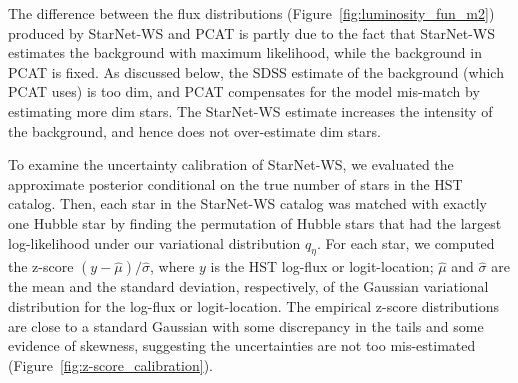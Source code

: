 The difference between the flux distributions  (Figure~\ref{fig:luminosity_fun_m2}) produced by StarNet-WS and PCAT
is partly due to the fact that StarNet-WS estimates the background with maximum likelihood, while the background in PCAT is fixed.
As discussed below, the SDSS estimate of the background (which PCAT uses) is too dim, and PCAT compensates for the model mis-match by estimating more dim stars. 
The StarNet-WS estimate increases the intensity of the background, and hence does not over-estimate dim stars. 



To examine the uncertainty calibration of StarNet-WS, we evaluated the approximate posterior 
conditional on the true number of stars in the HST catalog. 
Then, each star in the StarNet-WS catalog was matched with exactly one Hubble star by finding the permutation of Hubble stars that had the largest log-likelihood under our variational distribution $q_\eta$. 
For each star, we computed the z-score $(y - \hat \mu) / \hat \sigma$, where $y$ is the HST log-flux or 
logit-location; $\hat \mu$ and $\hat\sigma$ are the mean and the standard deviation, respectively, of the Gaussian variational distribution for the log-flux or logit-location.
The empirical z-score distributions are close to a standard Gaussian with some discrepancy in the tails and some evidence of skewness, suggesting the uncertainties are not too mis-estimated (Figure~\ref{fig:z-score_calibration}). 

